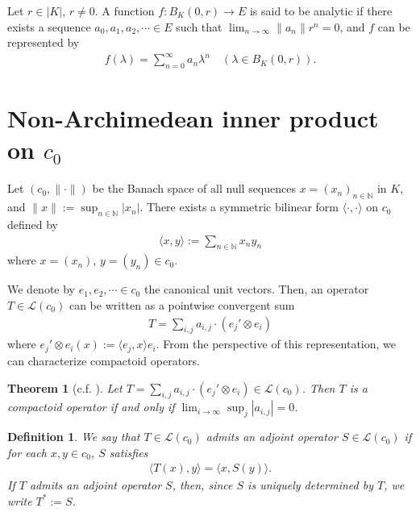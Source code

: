 \documentclass[12pt]{amsart}
\theoremstyle{plain}
\newtheorem{thm}[prop] {Theorem}
\newtheorem{dfn} [prop]{Definition}
\theoremstyle{definition}
\begin{document}
Let $r \in |K|$, $r \neq 0$. A function $f : B_K(0,r) \to E$ is said to be analytic if there exists a sequence $a_0, a_1, a_2, \cdots \in E$ such that $\lim_{n \to \infty} \|a_n\| r^n = 0$, and $f$ can be represented by
  \begin{align*}
    f(\lambda) = \sum_{n = 0}^{\infty} a_n \lambda^{n} \quad (\lambda \in B_K(0,r)).
  \end{align*}

\section{Non-Archimedean inner product on $c_0$}
Let $(c_0,\|\cdot\|)$ be the Banach space of all null sequences $x = (x_n)_{n \in \mathbb{N}}$ in $K$, and $\|x\| := \sup_{n \in \mathbb{N}} |x_n|$. There exists a symmetric bilinear form $\langle \cdot, \cdot \rangle$ on $c_0$ defined by
\begin{align*}
  \langle x, y \rangle := \sum_{n \in \mathbb{N}} x_n y_n
\end{align*}
where $x = (x_n)$, $y = (y_n) \in c_0$. \par

We denote by $e_1, e_2, \cdots \in c_0$ the canonical unit vectors. Then, an operator $T \in \mathcal{L}(c_0)$ can be written as a pointwise convergent sum 
\begin{align*}
  T = \sum_{i,j} a_{i,j} \cdot (e_j' \otimes e_i)
\end{align*}
where $e_j' \otimes e_i (x) := \langle e_j, x \rangle e_i$. From the perspective of this representation, we can characterize compactoid operators. 

\begin{thm}[c.f. {\cite[Theorem 8.1.9]{sch1}}] \label{c1}
  Let $T = \sum_{i,j} a_{i,j} \cdot (e_j' \otimes e_i) \in \mathcal{L}(c_0)$. Then $T$ is a compactoid operator if and only if $\lim_{i \to \infty} \sup_j |a_{i,j}| = 0$.
\end{thm}

\begin{dfn}
  We say that $T \in \mathcal{L}(c_0)$ admits an adjoint operator $S \in \mathcal{L}(c_0)$ if for each $x,y \in c_0$, $S$ satisfies
  \begin{align*}
    \langle T(x), y \rangle = \langle x, S(y) \rangle.
  \end{align*}
  If $T$ admits an adjoint operator $S$, then, since $S$ is uniquely determined by $T$, we write $T^* := S$.
\end{dfn}
\end{document}
